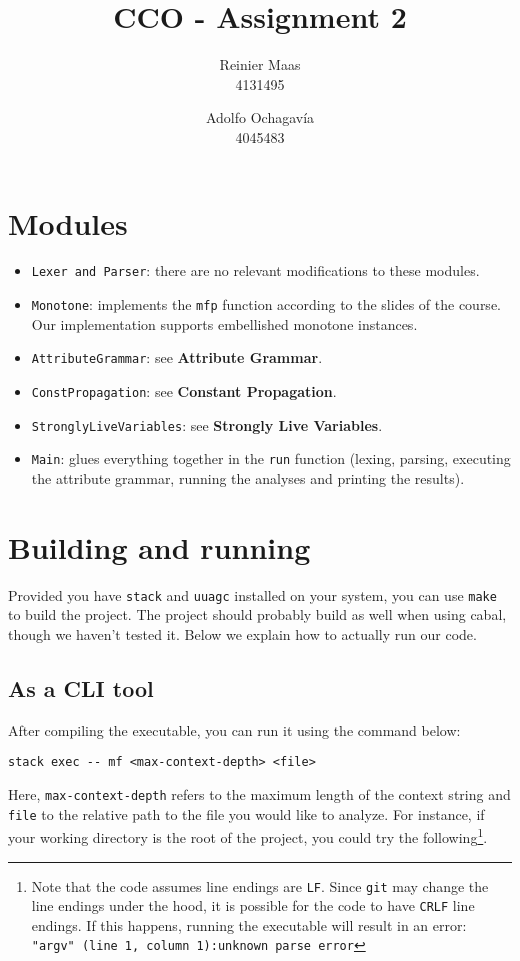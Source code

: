 \documentclass{article}
\author{
  Reinier Maas \\ 4131495
  \and
  Adolfo Ochagavía \\ 4045483
}
\title{CCO - Assignment 2}
\begin{document}
\maketitle

\section{Modules}

\begin{itemize}
\item \texttt{Lexer and Parser}: there are no relevant modifications to these modules.
\item \texttt{Monotone}: implements the \texttt{mfp} function according to the slides of the course. Our implementation supports embellished monotone instances.
\item \texttt{AttributeGrammar}: see \textbf{Attribute Grammar}.
\item \texttt{ConstPropagation}: see \textbf{Constant Propagation}.
\item \texttt{StronglyLiveVariables}: see \textbf{Strongly Live Variables}.
\item \texttt{Main}: glues everything together in the \texttt{run} function (lexing, parsing, executing the attribute grammar, running the analyses and printing the results).
\end{itemize}

\section{Building and running}

Provided you have \texttt{stack} and \texttt{uuagc} installed on your system, you can use \texttt{make} to build the project.
The project should probably build as well when using cabal, though we haven't tested it.
Below we explain how to actually run our code.

\subsection*{As a CLI tool}

After compiling the executable, you can run it using the command below:

\begin{verbatim}
stack exec -- mf <max-context-depth> <file>
\end{verbatim}

Here, \texttt{max-context-depth} refers to the maximum length of the context string and \texttt{file} to the relative path to the file you would like to analyze. For instance, if your working directory is the root of the project, you could try the following\footnote{Note that the code assumes line endings are \texttt{LF}. Since \texttt{git} may change the line endings under the hood, it is possible for the code to have \texttt{CRLF} line endings. If this happens, running the executable will result in an error: \texttt{"argv" (line 1, column 1):unknown parse error}}.
\end{document}
